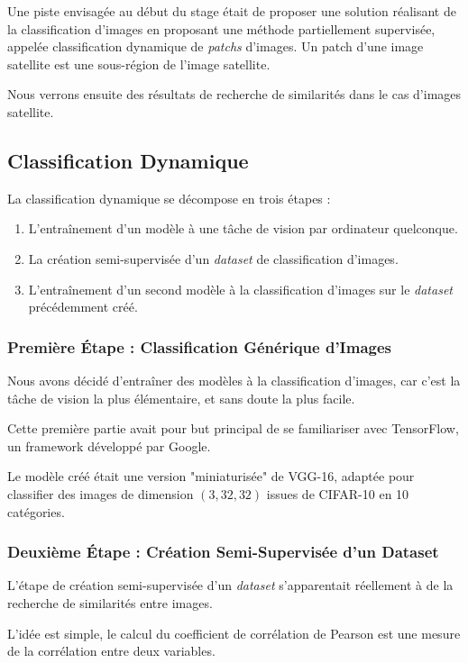 \documentclass[a4paper, 11pt]{report}
\begin{document}
Une piste envisagée au début du stage était de proposer une solution réalisant de la classification d'images en proposant une méthode partiellement supervisée, appelée classification dynamique de \emph{patchs} d'images.
Un patch d'une image satellite est une sous-région de l'image satellite.

Nous verrons ensuite des résultats de recherche de similarités dans le cas d'images satellite.

\subsection{Classification Dynamique}
La classification dynamique se décompose en trois étapes :
\begin{enumerate}
	\item L'entraînement d'un modèle à une tâche de vision par ordinateur quelconque.
	\item La création semi-supervisée d'un \emph{dataset} de classification d'images.
	\item L'entraînement d'un second modèle à la classification d'images sur le \emph{dataset} précédemment créé.
\end{enumerate}

\subsubsection{Première Étape : Classification Générique d'Images}
Nous avons décidé d'entraîner des modèles à la classification d'images, car c'est la tâche de vision la plus élémentaire, et sans doute la plus facile.

Cette première partie avait pour but principal de se familiariser avec TensorFlow, un framework développé par Google.

Le modèle créé était une version "miniaturisée" de VGG-16, adaptée pour classifier des images de dimension $(3, 32, 32)$ issues de CIFAR-10 en 10 catégories.

\subsubsection{Deuxième Étape : Création Semi-Supervisée d'un Dataset}
L'étape de création semi-supervisée d'un \emph{dataset} s'apparentait réellement à de la recherche de similarités entre images.

L'idée est simple, le calcul du coefficient de corrélation de Pearson  est une mesure de la corrélation entre deux variables.
\end{document}
